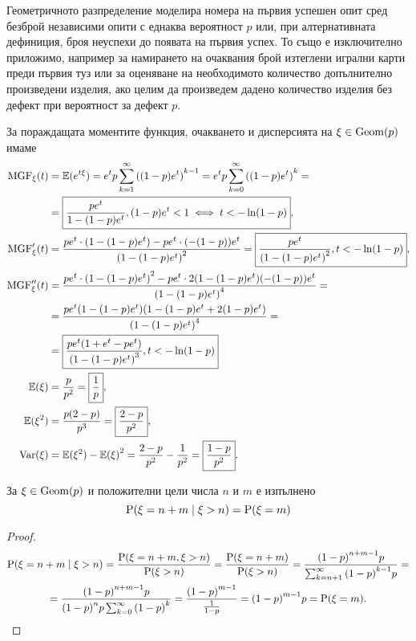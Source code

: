 \documentclass[numbers=endperiod, DIV=15, bibliography=totocnumbered]{scrartcl}
\begin{document}
Геометричното разпределение моделира номера на първия успешен опит сред безброй независими опити с еднаква вероятност $p$ или, при алтернативната дефиниция, броя неуспехи до появата на първия успех. То също е изключително приложимо, например за намирането на очаквания брой изтеглени игрални карти преди първия туз или за оценяване на необходимото количество допълнително произведени изделия, ако целим да произведем дадено количество изделия без дефект при вероятност за дефект $p$.

За пораждащата моментите функция, очакването и дисперсията на $\xi \in \operatorname{Geom}(p)$ имаме
\begingroup
\allowdisplaybreaks
\begin{align*}
  \operatorname{MGF}_\xi(t)
  &=
  \mathbb{E}(e^{t\xi})
  =
  e^t p \sum_{k=1}^\infty {((1-p) e^t)}^{k-1}
  =
  e^t p \sum_{k=0}^\infty {((1-p) e^t)}^k
  = \\ &=
  \boxed{\frac {p e^t} {1 - (1-p) e^t}, (1-p) e^t < 1 \iff t < -\ln(1-p)},
  \\
  \operatorname{MGF}'_\xi(t)
  &=
  \frac {p e^t \cdot (1 - (1-p) e^t) - p e^t \cdot (-(1-p)) e^t} {{(1 - (1-p) e^t)}^2}
  =
  \boxed{\frac {p e^t} {{(1 - (1-p) e^t)}^2}, t < -\ln(1-p)},
  \\
  \operatorname{MGF}''_\xi(t)
  &=
  \frac {p e^t \cdot {(1 - (1-p) e^t)}^2 - p e^t \cdot 2 (1 - (1-p) e^t) (-(1-p)) e^t} {{(1 - (1-p) e^t)}^4}
  = \\ &=
  \frac {p e^t (1 - (1-p) e^t) (1 - (1-p) e^t + 2 (1-p) e^t)} {{(1 - (1-p) e^t)}^4}
  = \\ &=
  \boxed{\frac {p e^t (1 + e^t - p e^t)} {{(1 - (1-p) e^t)}^3}, t < -\ln(1-p)}
  \\
  \mathbb{E}(\xi)
  &=
  \frac p {p^2}
  =
  \boxed{\frac 1 p},
  \\
  \mathbb{E}(\xi^2)
  &=
  \frac {p(2-p)} {p^3}
  =
  \boxed{\frac {2-p} {p^2}},
  \\
  \operatorname{Var}(\xi)
  &=
  \mathbb{E}(\xi^2) - {\mathbb{E}(\xi)}^2
  =
  \frac {2-p} {p^2} - \frac 1 {p^2}
  =
  \boxed{\frac {1-p} {p^2}}.
\end{align*}
\endgroup

\begin{theorem}
  За $\xi \in \operatorname{Geom}(p)$ и положителни цели числа $n$ и $m$ е изпълнено
  \begin{displaymath}
    \operatorname{P}(\xi = n + m \mid \xi > n) = \operatorname{P}(\xi = m)
  \end{displaymath}
\end{theorem}
\begin{proof}
  \begin{multline*}
    \operatorname{P}(\xi = n + m \mid \xi > n)
    =
    \frac {\operatorname{P}(\xi = n + m, \xi > n)} {\operatorname{P}(\xi > n)}
    =
    \frac {\operatorname{P}(\xi = n + m)} {\operatorname{P}(\xi > n)}
    =
    \frac {{(1-p)}^{n+m-1} p} {\sum_{k=n+1}^\infty {(1-p)}^{k-1} p}
    = \\ =
    \frac {{(1-p)}^{n+m-1} p} {{(1-p)}^n p \sum_{k=0}^\infty {(1-p)}^k}
    =
    \frac {{(1-p)}^{m-1}} {\frac 1 {1 - p}}
    =
    {(1-p)}^{m-1} p
    =
    \operatorname{P}(\xi = m).
  \end{multline*}
\end{proof}
\end{document}
